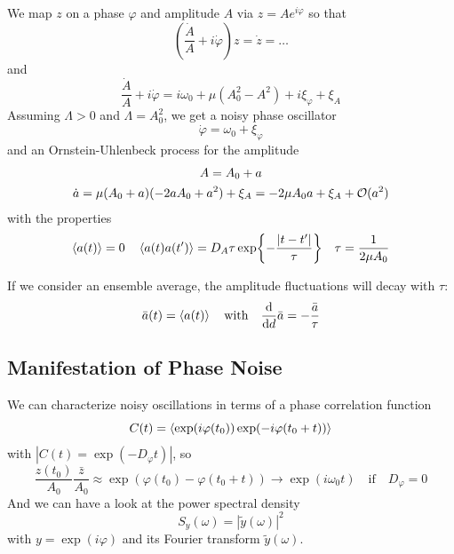 \documentclass{notebook}
\begin{document}
We map $z$ on a phase $\varphi$ and amplitude $A$ via $z = A e^{i \varphi}$ so that
%
\begin{equation}
\left( \frac{\dot{A}}{A} + i \dot{\varphi} \right) z = \dot{z} = \dots
\end{equation}
%
and
%
\begin{equation}
\frac{\dot{A}}{A} + i \dot{\varphi} = i \omega_0 + \mu(A_0^2- A^2) + i \xi_{\varphi} + \xi_A
\end{equation}
%
Assuming $\Lambda > 0$ and $\Lambda = A_0^2$, we get a noisy phase oscillator
%
\begin{equation}
\dot{\varphi} = \omega_0 + \xi_{\varphi}
\end{equation}
%
and an Ornstein-Uhlenbeck process for the amplitude
%
%
\begin{equation}
%
\begin{gathered}
A = A_0 + a \\
\dot{a} = \mu(A_0 + a)(-2 a A_0 + a^2) + \xi_A = -2\mu A_0 a + \xi_A + \O{a^2}
\end{gathered}
%
\end{equation}
%
with the properties
%
\begin{equation*}
	\expval{a(t)} = 0 \quad \expval{a(t)a(t')} = D_A \tau \exp{- \frac{|t-t'|}{\tau}} \quad \tau = \frac{1}{2 \mu A_0}
\end{equation*}
%

If we consider an ensemble average, the amplitude fluctuations will decay with $\tau$: 
%
\begin{equation*}
	\bar{a}(t) = \expval{a(t)} \quad \mathrm{with} \quad \dv{d} \bar{a} = - \frac{\bar{a}}{\tau}
\end{equation*}


\subsection*{Manifestation of Phase Noise}

We can characterize noisy oscillations in terms of a phase correlation function
%
\begin{equation}
C(t) = \expval{\exp(i \varphi(t_0)) \exp(-i \varphi(t_0 + t))}
\end{equation}
%
with $|C(t) = \exp(-D_{\varphi} t)|$, so
%
\begin{equation*}
	\frac{z(t_0)}{A_0} \frac{\bar{z}}{A_0} \approx \exp(\varphi(t_0)-\varphi(t_0+t)) \to \exp(i \omega_0 t) \quad \mathrm{if} \quad D_{\varphi} = 0
\end{equation*}
%
And we can have a look at the power spectral density 
%
\begin{equation}
S_y(\omega) = |\tilde{y}(\omega)|^2
\end{equation}
%
with $y = \exp(i \varphi)$ and its Fourier transform $\tilde{y}(\omega)$. 
\end{document}
